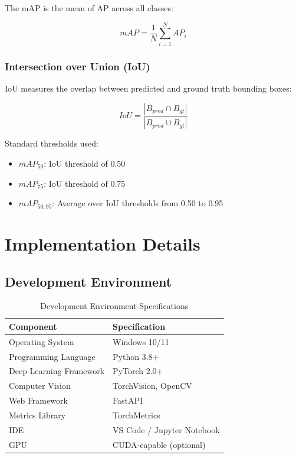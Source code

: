 \documentclass[12pt,a4paper]{article}
\begin{document}
The mAP is the mean of AP across all classes:

\begin{equation}
    mAP = \frac{1}{N} \sum_{i=1}^{N} AP_i
\end{equation}

\subsubsection{Intersection over Union (IoU)}

IoU measures the overlap between predicted and ground truth bounding boxes:

\begin{equation}
    IoU = \frac{|B_{pred} \cap B_{gt}|}{|B_{pred} \cup B_{gt}|}
\end{equation}

Standard thresholds used:
\begin{itemize}
    \item $mAP_{50}$: IoU threshold of 0.50
    \item $mAP_{75}$: IoU threshold of 0.75
    \item $mAP_{50:95}$: Average over IoU thresholds from 0.50 to 0.95
\end{itemize}

\section{Implementation Details}

\subsection{Development Environment}

\begin{table}[H]
    \centering
    \caption{Development Environment Specifications}
    \label{tab:environment}
    \begin{tabular}{|l|l|}
        \hline
        \textbf{Component} & \textbf{Specification} \\
        \hline
        Operating System & Windows 10/11 \\
        Programming Language & Python 3.8+ \\
        Deep Learning Framework & PyTorch 2.0+ \\
        Computer Vision & TorchVision, OpenCV \\
        Web Framework & FastAPI \\
        Metrics Library & TorchMetrics \\
        IDE & VS Code / Jupyter Notebook \\
        GPU & CUDA-capable (optional) \\
        \hline
    \end{tabular}
\end{table}
\end{document}
